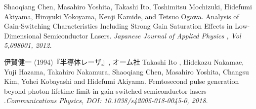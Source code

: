 \begin{thebibliography}{99}
 Shaoqiang Chen, Masahiro Yoshita, Takashi Ito, Toshimitsu Mochizuki, Hidefumi Akiyama, Hiroyuki Yokoyama, Kenji Kamide, and Tetsuo Ogawa. Analysis of Gain-Switching Characteristics Including Strong Gain Saturation Effects in Low-Dimensional Semiconductor Lasers. \sl Japanese Journal of Applied  Physics \rm , Vol 5,098001, 2012.

 伊賀健一 (1994)『半導体レーザ』, オーム社
Takashi Ito
, Hidekazu Nakamae, Yuji Hazama, Takahiro Nakamura, Shaoqiang Chen, Masahiro Yoshita, Changsu Kim, Yohei Kobayashi and Hidefumi Akiyama.
Femtosecond pulse generation beyond photon lifetime limit in gain-switched semiconductor lasers .\sl Communications Physics\rm , DOI: 10.1038/s42005-018-0045-0, 2018. 


\end{thebibliography}
